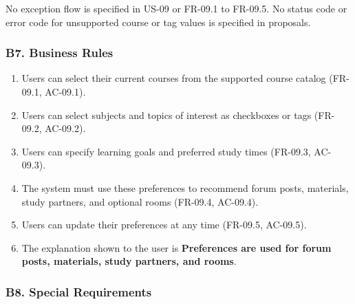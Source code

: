 \documentclass[12pt]{article}
\begin{document}
No exception flow is specified in US-09 or FR-09.1 to FR-09.5. No status code or error code for unsupported course or tag values is specified in proposals.
\par\medskip

\hypertarget{sec:b7-business-rules}{}
\subsubsection*{B7. Business Rules}
\par\medskip

\begin{enumerate}
\item Users can select their current courses from the supported course catalog (FR-09.1, AC-09.1).
\item Users can select subjects and topics of interest as checkboxes or tags (FR-09.2, AC-09.2).
\item Users can specify learning goals and preferred study times (FR-09.3, AC-09.3).
\item The system must use these preferences to recommend forum posts, materials, study partners, and optional rooms (FR-09.4, AC-09.4).
\item Users can update their preferences at any time (FR-09.5, AC-09.5).
\item The explanation shown to the user is \textbf{Preferences are used for forum posts, materials, study partners, and rooms}.
\end{enumerate}
\par\medskip

\hypertarget{sec:b8-special-requirements}{}
\subsubsection*{B8. Special Requirements}
\par\medskip
\end{document}
